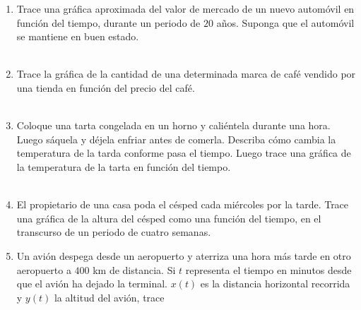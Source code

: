 \begin{enumerate}
    \item Trace una gráfica aproximada del valor de mercado de un nuevo automóvil en función del tiempo, durante un periodo de $20$ años. Suponga que el automóvil se mantiene en buen estado.\\\\

    \item Trace la gráfica de la cantidad de una determinada marca de café vendido por una tienda en función del precio del café.\\\\

    \item Coloque una tarta congelada en un horno y caliéntela durante una hora. Luego sáquela y déjela enfriar antes de comerla. Describa cómo cambia la temperatura de la tarda conforme pasa el tiempo. Luego trace una gráfica de la temperatura de la tarta en función del tiempo.\\\\

    \item El propietario de una casa poda el césped cada miércoles por la tarde. Trace una gráfica de la altura del césped como una función del tiempo, en el transcurso de un periodo de cuatro semanas.

            \begin{center}
            \end{center}  

	\item  Un avión despega desde un aeropuerto y aterriza una hora más tarde en otro aeropuerto a $400$ km de distancia. Si $t$ representa el tiempo en minutos desde que el avión ha dejado la terminal. $x(t)$ es la distancia horizontal recorrida y $y(t)$ la altitud del avión, trace
	    \begin{enumerate}[\bfseries (a)]


\end{enumerate}
\end{enumerate}

